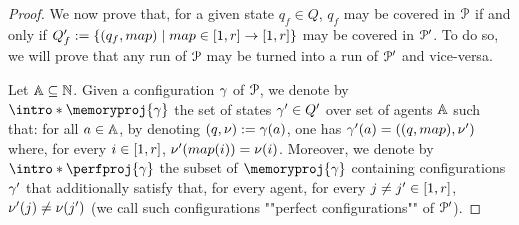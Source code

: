 \begin{proof}
	We now prove that, for a given state $q_f \in Q$, $q_f$ may be covered in $\mathcal{P}$ if and only if $Q_f' := \set{(q_f, \map) \mid \map \in \nset{1}{r} \to \nset{1}{r}}$ may be covered in $\mathcal{P}'$. To do so, we will prove that any run of $\mathcal{P}$ may be turned into a run of $\mathcal{P}'$ and vice-versa. 
  
	Let $\mathbb{A} \subseteq \mathbb{N}$.
	Given a configuration $\gamma$ of $\mathcal{P}$, we denote by \AP $\intro*\memoryproj{\config}$ 
	the set of states $\gamma' \in Q'$ over set of agents $\mathbb{A}$ such that:
	 for all $a \in \mathbb{A}$, by denoting $(q, \nu):= \gamma(a)$, one has $\config'(a) = ((q, \map), \localdata')$ where, for every $i \in [1,r]$, $\localdata'(\map(i)) = \localdata(i)$. 
	Moreover, we denote by \AP $\intro*\perfproj{\config}$ 
	the subset of $\memoryproj{\config}$ containing configurations 
	$\gamma'$ that additionally satisfy that, for every agent, for every $j \ne j' \in [1,r]$, $\nu'(j) \ne \nu(j')$ (we call such configurations ""perfect configurations"" of $\mathcal{P}'$).


\end{proof}
